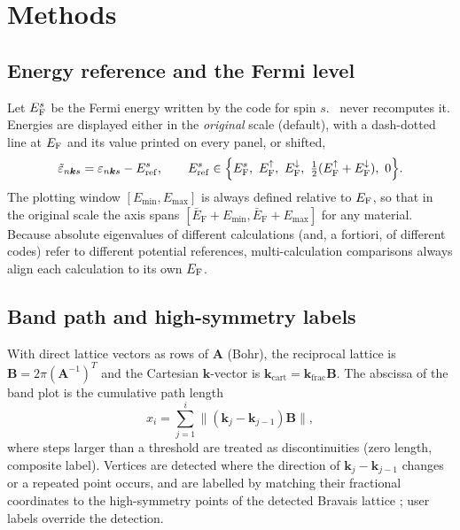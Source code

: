 \section{Methods}\label{sec:methods}
\subsection{Energy reference and the Fermi level}
Let $E_\mathrm{F}^{s}$ be the Fermi energy written by the code for spin $s$. \BMR\ never recomputes it. Energies are displayed either in the \emph{original} scale (default), with a dash-dotted line at $E_\mathrm{F}$ and its value printed on every panel, or shifted,
\begin{equation}
\tilde\varepsilon_{n\bm{k} s}=\varepsilon_{n\bm{k} s}-E_\mathrm{ref}^{s},\qquad E_\mathrm{ref}^{s}\in\Big\{\eF^{s},\ \eF^{\uparrow},\ \eF^{\downarrow},\ \tfrac12(\eF^{\uparrow}+\eF^{\downarrow}),\ 0\Big\}.
\end{equation}
The plotting window $[E_\mathrm{min},E_\mathrm{max}]$ is always defined relative to $E_\mathrm{F}$, so that in the original scale the axis spans $[\bar E_\mathrm{F}+E_\mathrm{min},\bar E_\mathrm{F}+E_\mathrm{max}]$ for any material. Because absolute eigenvalues of different calculations (and, a fortiori, of different codes) refer to different potential references, multi-calculation comparisons always align each calculation to its own $E_\mathrm{F}$.

\subsection{Band path and high-symmetry labels}
With direct lattice vectors as rows of $\mathbf A$ (Bohr), the reciprocal lattice is $\mathbf B=2\pi(\mathbf A^{-1})^{T}$ and the Cartesian $\bm{k}$-vector is $\bm{k}_\mathrm{cart}=\bm{k}_\mathrm{frac}\mathbf B$. The abscissa of the band plot is the cumulative path length
\begin{equation}
x_i=\sum_{j=1}^{i}\lVert(\bm{k}_j-\bm{k}_{j-1})\mathbf B\rVert ,
\end{equation}
where steps larger than a threshold are treated as discontinuities (zero length, composite label). Vertices are detected where the direction of $\bm{k}_j-\bm{k}_{j-1}$ changes or a repeated point occurs, and are labelled by matching their fractional coordinates to the high-symmetry points of the detected Bravais lattice \cite{setyawan2010}; user labels override the detection.

